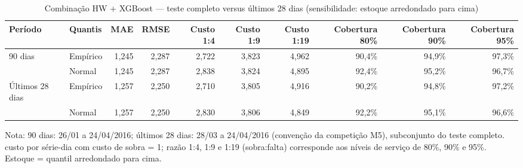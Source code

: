 \begin{table}[htbp]
\centering
\small
\caption{Combinação HW + XGBoost — teste completo versus últimos 28 dias (sensibilidade: estoque arredondado para cima)}
\label{tab:comb_verificacao_28d_sensibilidade}
\begin{tabular}{llrrrrrrrr}
\toprule
Período & Quantis & MAE & RMSE & Custo 1:4 & Custo 1:9 & Custo 1:19 & Cobertura 80\% & Cobertura 90\% & Cobertura 95\% \\
\midrule
90 dias & Empírico & 1,245 & 2,287 & 2,722 & 3,823 & 4,962 & 90,4\% & 94,9\% & 97,3\% \\
 & Normal & 1,245 & 2,287 & 2,838 & 3,824 & 4,895 & 92,4\% & 95,2\% & 96,7\% \\
\addlinespace
Últimos 28 dias & Empírico & 1,257 & 2,250 & 2,710 & 3,805 & 4,916 & 90,2\% & 94,8\% & 97,2\% \\
 & Normal & 1,257 & 2,250 & 2,830 & 3,806 & 4,849 & 92,2\% & 95,1\% & 96,6\% \\
\bottomrule
\end{tabular}
\par\smallskip
{\footnotesize Nota: 90 dias: 26/01 a 24/04/2016; últimos 28 dias: 28/03 a 24/04/2016 (convenção da competição M5), subconjunto do teste completo. custo por série-dia com custo de sobra = 1; razão 1:4, 1:9 e 1:19 (sobra:falta) corresponde aos níveis de serviço de 80\%, 90\% e 95\%. Estoque = quantil arredondado para cima.}
\end{table}
